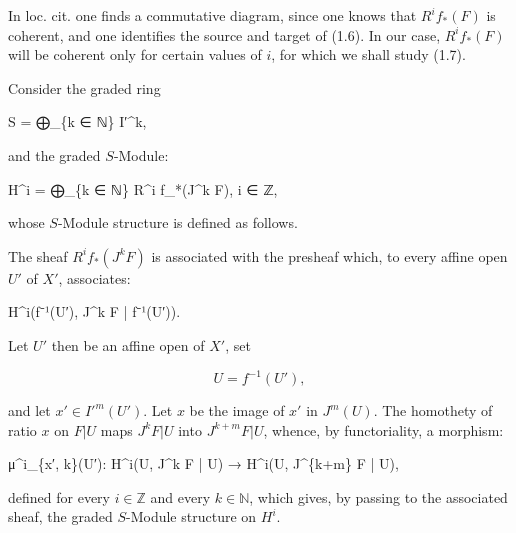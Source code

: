\documentclass[
  11pt,
  a4paper,
]{book}
\newenvironment{Shaded}{}{}
\newcommand{\NormalTok}[1]{#1}
\begin{document}
In loc. cit. one finds a commutative diagram, since one knows that
\(R^{i} f_{*}(F)\) is coherent, and one identifies the source and target
of (1.6). In our case, \(R^{i} f_{*}(F)\) will be coherent only for
certain values of \(i\), for which we shall study (1.7).

Consider the graded ring

\begin{Shaded}
\begin{Highlighting}[]
\NormalTok{S = ⨁\_\{k ∈ ℕ\} I′\^{}k,}
\end{Highlighting}
\end{Shaded}

and the graded \(S\)-Module:

\begin{Shaded}
\begin{Highlighting}[]
\NormalTok{H\^{}i = ⨁\_\{k ∈ ℕ\} R\^{}i f\_*(J\^{}k F),    i ∈ ℤ,}
\end{Highlighting}
\end{Shaded}

whose \(S\)-Module structure is defined as follows.

The sheaf \(R^{i} f_{*}(J^{k} F)\) is associated with the presheaf
which, to every affine open \(U'\) of \(X'\), associates:

\begin{Shaded}
\begin{Highlighting}[]
\NormalTok{H\^{}i(f⁻¹(U′), J\^{}k F | f⁻¹(U′)).}
\end{Highlighting}
\end{Shaded}

Let \(U'\) then be an affine open of \(X'\), set

\[ U = f^{-1}(U'), \]

and let \(x' \in I'^{m}(U')\). Let \(x\) be the image of \(x'\) in
\(J^{m}(U)\). The homothety of ratio \(x\) on \(F | U\) maps
\(J^{k} F | U\) into \(J^{k+m} F | U\), whence, by functoriality, a
morphism:

\begin{Shaded}
\begin{Highlighting}[]
\NormalTok{μ\^{}i\_\{x′, k\}(U′): H\^{}i(U, J\^{}k F | U) → H\^{}i(U, J\^{}\{k+m\} F | U),}
\end{Highlighting}
\end{Shaded}

defined for every \(i \in \mathbb{Z}\) and every \(k \in \mathbb{N}\),
which gives, by passing to the associated sheaf, the graded \(S\)-Module
structure on \(H^{i}\).
\end{document}
